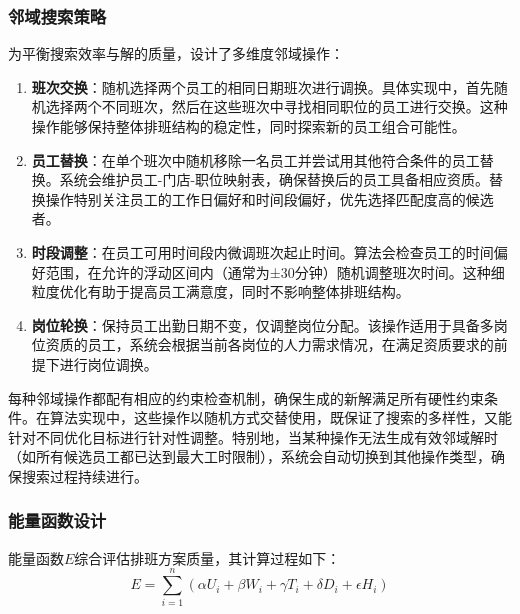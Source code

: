 \documentclass{ctexart}
\begin{document}
\subsubsection{邻域搜索策略}
为平衡搜索效率与解的质量，设计了多维度邻域操作：
\begin{enumerate}
    \item \textbf{班次交换}：随机选择两个员工的相同日期班次进行调换。具体实现中，首先随机选择两个不同班次，然后在这些班次中寻找相同职位的员工进行交换。这种操作能够保持整体排班结构的稳定性，同时探索新的员工组合可能性。
    
    \item \textbf{员工替换}：在单个班次中随机移除一名员工并尝试用其他符合条件的员工替换。系统会维护员工-门店-职位映射表，确保替换后的员工具备相应资质。替换操作特别关注员工的工作日偏好和时间段偏好，优先选择匹配度高的候选者。
    
    \item \textbf{时段调整}：在员工可用时间段内微调班次起止时间。算法会检查员工的时间偏好范围，在允许的浮动区间内（通常为±30分钟）随机调整班次时间。这种细粒度优化有助于提高员工满意度，同时不影响整体排班结构。
    
    \item \textbf{岗位轮换}：保持员工出勤日期不变，仅调整岗位分配。该操作适用于具备多岗位资质的员工，系统会根据当前各岗位的人力需求情况，在满足资质要求的前提下进行岗位调换。
\end{enumerate}

每种邻域操作都配有相应的约束检查机制，确保生成的新解满足所有硬性约束条件。在算法实现中，这些操作以随机方式交替使用，既保证了搜索的多样性，又能针对不同优化目标进行针对性调整。特别地，当某种操作无法生成有效邻域解时（如所有候选员工都已达到最大工时限制），系统会自动切换到其他操作类型，确保搜索过程持续进行。

\subsubsection{能量函数设计}
能量函数$E$综合评估排班方案质量，其计算过程如下：
\begin{equation}
E = \sum_{i=1}^{n} \left( \alpha U_i + \beta W_i + \gamma T_i + \delta D_i + \epsilon H_i \right)
\end{equation}
\end{document}
